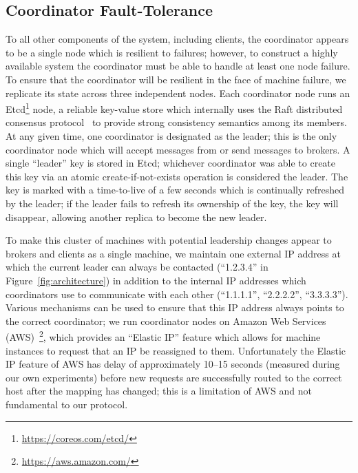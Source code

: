 \subsection{Coordinator Fault-Tolerance}
\label{subsec:coordinator_fault_tolerance}

To all other components of the system, including clients, the coordinator appears to be a single node which is resilient to failures; however, to construct a highly available system the coordinator must be able to handle at least one node failure.
To ensure that the coordinator will be resilient in the face of machine failure, we replicate its state across three independent nodes.
Each coordinator node runs an Etcd\footnote{\url{https://coreos.com/etcd/}} node, a reliable key-value store which internally uses the Raft distributed consensus protocol~\cite{ongaro2014} to provide strong consistency semantics among its members.
At any given time, one coordinator is designated as the leader; this is the only coordinator node which will accept messages from or send messages to brokers.
A single ``leader'' key is stored in Etcd; whichever coordinator was able to create this key via an atomic create-if-not-exists operation is considered the leader.
The key is marked with a time-to-live of a few seconds which is continually refreshed by the leader; if the leader fails to refresh its ownership of the key, the key will disappear, allowing another replica to become the new leader.

To make this cluster of machines with potential leadership changes appear to brokers and clients as a single machine, we maintain one external IP address at which the current leader can always be contacted (``1.2.3.4'' in Figure~\ref{fig:architecture}) in addition to the internal IP addresses which coordinators use to communicate with each other (``1.1.1.1'', ``2.2.2.2'', ``3.3.3.3'').
Various mechanisms can be used to ensure that this IP address always points to the correct coordinator; we run coordinator nodes on Amazon Web Services (AWS)~\footnote{\url{https://aws.amazon.com/}}, which provides an ``Elastic IP'' feature which allows for machine instances to request that an IP be reassigned to them.
Unfortunately the Elastic IP feature of AWS has delay of approximately 10--15 seconds (measured during our own experiments) before new requests are successfully routed to the correct host after the mapping has changed; this is a limitation of AWS and not fundamental to our protocol.

